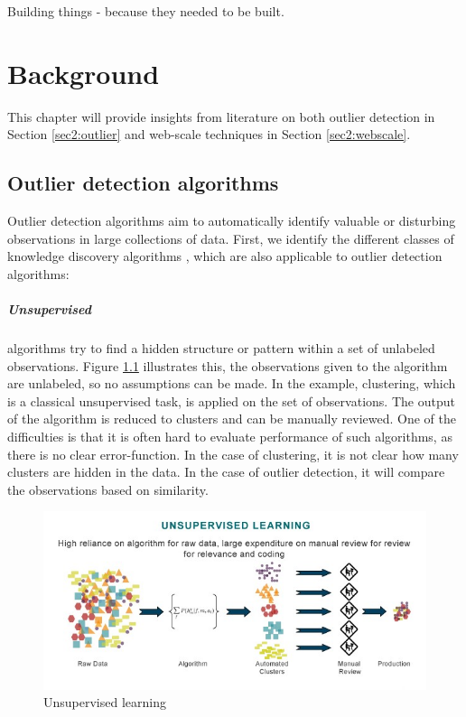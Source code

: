 \begin{savequote}[75mm] 
Building things - because they needed to be built.  
\end{savequote}

\chapter{Background \label{chap2:background}}
This chapter will provide insights from literature on both outlier detection in Section \ref{sec2:outlier} and web-scale techniques in Section \ref{sec2:webscale}.

\section{Outlier detection algorithms \label{sec2:outlier}}
Outlier detection algorithms aim to automatically identify valuable or disturbing observations in large collections of data. First, we identify the different classes of knowledge discovery algorithms \cite{Fayyad:1996:DMK:257938.257942}, which are also applicable to outlier detection algorithms:

\paragraph{Unsupervised} algorithms try to find a hidden structure or pattern within a set of unlabeled observations. Figure \ref{fig:unsupervised} illustrates this, the observations given to the algorithm are unlabeled, so no assumptions can be made. In the example, clustering, which is a classical unsupervised task, is applied on the set of observations. The output of the algorithm is reduced to clusters and can be manually reviewed. One of the difficulties is that it is often hard to evaluate performance of such algorithms, as there is no clear error-function. In the case of clustering, it is not clear how many clusters are hidden in the data. In the case of outlier detection, it will compare the observations based on similarity.

\begin{figure}[ht!]
\centering
\includegraphics[width=\textwidth]{figures/unsupervised.jpg}
\caption{Unsupervised learning}
\label{fig:unsupervised}
\end{figure}

